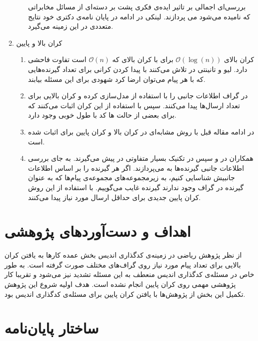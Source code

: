 \begin{enumerate}
\begin{enumerate}
 		\cite{7176784}
 		بررسی‌ای اجمالی بر تاثیر ایده‌ی فکری پشت
 		\picod
 		بر دسته‌ای از مسائل مخابراتی که
 		نامیده می‌شود می پردازند. لینکی در ادامه در پایان نامه‌ی دکتری خود
 		\cite{linqiphd}
 		نتایج متعددی در این زمینه می‌گیرد.
 	\end{enumerate}
 	\item کران بالا و پایین
 	\begin{enumerate}
 		\item 
 		کران بالای
 		$\mathcal{O}(\log(n))$
 		برای
 		\picod
 		با کران بالای
 		\icod
 		که
 		$\mathcal{O}(n)$
 		است تفاوت فاحشی دارد. لیو و تانینتی در
 		\cite{7606849}
 		تلاش می‌کنند با پیدا کردن کرانی برای تعداد گیرنده‌هایی که با هر پیام می‌توان ارضا کرد شهودی برای این مسئله بیابند.
 		\item 
 		در
 		\cite{9518120}
 		گراف اطلاعات جانبی را با استفاده از 
 		مدل‌سازی کرده و کران بالایی برای تعداد ارسال‌ها پیدا می‌کنند. سپس با استفاده از این کران اثبات می‌کنند که برای بعضی از حالت ها کد با طول خوبی وجود دارد.
 		\item
 		در ادامه مقاله قبل با روش مشابه‌ای در
 		\cite{9965883}
 		کران بالا و کران پایین برای
 		\picod
 		اثبات شده است.
 		\item
 		همکاران در
 		\cite{ong2019improved}
 		و سپس در
 		\cite{8849527}
 		تکنیک بسیار متفاوتی در پیش می‌گیرند. به جای بررسی اطلاعات جانبی گیرنده‌ها به 
 		می‌پردازند. اگر هر گیرنده را بر اساس اطلاعات جانبیش شناسایی کنیم، به زیرمجموعه‌های مجموعه‌ی پیام‌ها که به عنوان گیرنده در گراف وجود ندارند گیرنده غایب می‌گوییم. با استفاده از این روش کران پایین جدیدی برای حداقل ارسال مورد نیاز پیدا می‌کنند.
 	\end{enumerate}
 \end{enumerate}
 
\pagebreak 
\section{اهداف و دست‌آورد‌های پژوهشی}
از نظر پژوهش ریاضی در زمینه‌ی کدگذاری اندیس بخش عمده کارها به یافتن کران بالایی برای تعداد پیام مورد نیاز روی گراف‌های مختلف صورت گرفته است. به طور خاص در مسئله‌ی کدگذاری اندیس منعطف به این مسئله تشدید نیز می‌شود و تقریبا کار پژوهشی‌ مهمی روی کران پایین انجام نشده است. هدف اولیه شروع این پژوهش تکمیل این بخش از پژوهش‌ها با یافتن کران پایین برای مسئله‌ی کدگذاری اندیس بود.
\section{ساختار پایان‌نامه}

